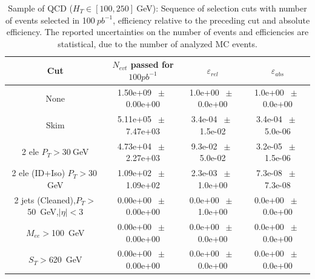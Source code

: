\begin{table}[htbp] 
\begin{center} 
\begin{tabular}{|c|c|c|c|} 
\hline\hline 
 Cut & $N_{evt}$ passed for $100pb^{-1}$ & $\varepsilon_{rel}$ & $\varepsilon_{abs}$ \\ 
\hline\hline 
None       &        1.50e+09       $~\pm~$       0.00e+00        &        1.0e+00       $~\pm~$       0.0e+00        &        1.0e+00       $~\pm~$       0.0e+00       \\       
       Skim       &        5.11e+05       $~\pm~$       7.47e+03        &        3.4e-04       $~\pm~$       1.5e-02        &        3.4e-04       $~\pm~$       5.0e-06       \\       
       2 ele $P_T>30~$GeV       &        4.73e+04       $~\pm~$       2.27e+03        &        9.3e-02       $~\pm~$       5.0e-02        &        3.2e-05       $~\pm~$       1.5e-06       \\       
       2 ele (ID+Iso) $P_T>30~$GeV       &        1.09e+02       $~\pm~$       1.09e+02        &        2.3e-03       $~\pm~$       1.0e+00        &        7.3e-08       $~\pm~$       7.3e-08       \\       
       2 jets (Cleaned),$P_T>$50~GeV,$|\eta|<$3       &        0.00e+00       $~\pm~$       0.00e+00        &        0.0e+00       $~\pm~$       1.0e+00        &        0.0e+00       $~\pm~$       0.0e+00       \\       
       $M_{ee}>$100~GeV       &        0.00e+00       $~\pm~$       0.00e+00        &        0.0e+00       $~\pm~$       0.0e+00        &        0.0e+00       $~\pm~$       0.0e+00       \\       
       $S_T>$620~GeV       &        0.00e+00       $~\pm~$       0.00e+00        &        0.0e+00       $~\pm~$       0.0e+00        &        0.0e+00       $~\pm~$       0.0e+00       \\       
       \hline\hline 
\end{tabular} 
\end{center} 
\caption{Sample of QCD ($H_T \in [100,250]~$GeV): Sequence of selection cuts with number of events selected in 100$~pb^{-1}$, efficiency relative to the preceding cut and absolute efficiency. The reported uncertainties on the number of events and efficiencies are statistical, due to the number of analyzed MC events.} 
\label{tab:effic-QCD-100-250} 
\end{table} 

